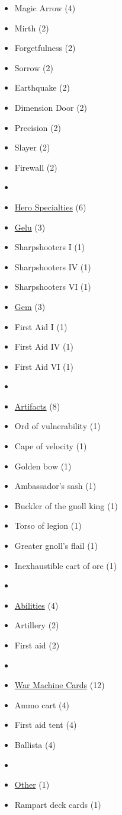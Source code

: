 \begin{multicols}{3}
\begin{itemize}[leftmargin=0pt, label={}, noitemsep, noitemsep]
  \item Magic Arrow (4)
  \item Mirth (2)
  \item Forgetfulness (2)
  \item Sorrow (2)
  \item Earthquake (2)
  \item Dimension Door (2)
  \item Precision (2)
  \item Slayer (2)
  \item Firewall (2)
  \item
  \item \underline{Hero Specialties} (6)
  \item \underline{Gelu} (3)
  \item Sharpshooters I (1)
  \item Sharpshooters IV (1)
  \item Sharpshooters VI (1)
  \item \underline{Gem} (3)
  \item First Aid I (1)
  \item First Aid IV (1)
  \item First Aid VI (1)
  \item
  \item \underline{Artifacts} (8)
  \item Ord of vulnerability (1)
  \item Cape of velocity (1)
  \item Golden bow (1)
  \item Ambassador's sash (1)
  \item Buckler of the gnoll king (1)
  \item Torso of legion (1)
  \item Greater gnoll's flail (1)
  \item Inexhaustible cart of ore (1)
  \item
  \item \underline{Abilities} (4)
  \item Artillery (2)
  \item First aid (2)
  \item
  \item \underline{War Machine Cards} (12)
  \item Ammo cart (4)
  \item First aid tent (4)
  \item Ballista (4)
  \item
  \item \underline{Other} (1)
  \item Rampart deck cards (1)
\end{itemize}

\end{multicols}
